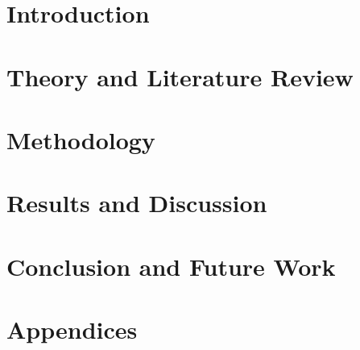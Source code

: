 \documentclass[a4paper, 12pt, openany]{book}
\begin{document}
\mainmatter
{}

\chapter{Introduction}
\label{ch:introduction}

\cleardoublepage

\chapter{Theory and Literature Review}
\label{ch:theory_and_literature_review}

\cleardoublepage

\chapter{Methodology}
\label{ch:methodology}

\cleardoublepage

\chapter{Results and Discussion}
\label{ch:results_and_discussion}

\cleardoublepage

\chapter{Conclusion and Future Work}
\label{ch:conclusion_and_future_work}

\cleardoublepage

\backmatter

\printbibliography[title={References}]
\cleardoublepage

\chapter*{\LARGE \textbf{Appendices}}
\label{ch:appendices}
\fancyhf{} %
\renewcommand{\headrulewidth}{0pt} %
\fancyfoot[C]{\thepage} %
\appendix

\end{document}
